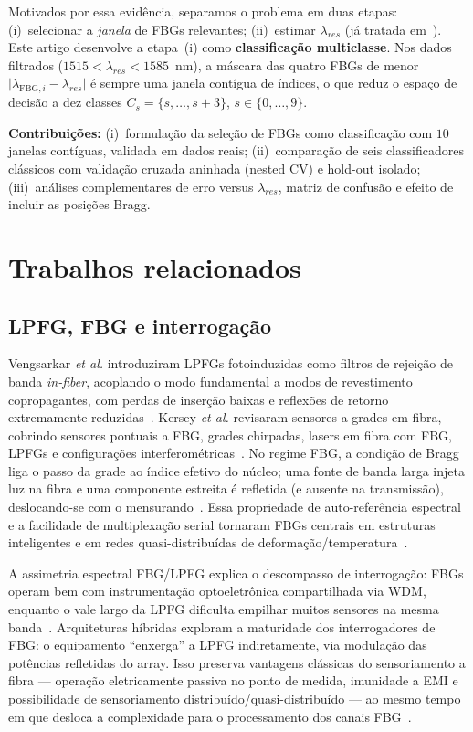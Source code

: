 \documentclass[conference]{IEEEtran}
\begin{document}
Motivados por essa evidência, separamos o problema em duas etapas: (i)~selecionar a \emph{janela} de FBGs relevantes; (ii)~estimar $\lambda_{res}$ (já tratada em~\cite{Barino2025TIM}).
Este artigo desenvolve a etapa~(i) como \textbf{classificação multiclasse}.
Nos dados filtrados ($1515<\lambda_{res}<1585$~nm), a máscara das quatro FBGs de menor $\lvert\lambda_{\mathrm{FBG},i}-\lambda_{res}\rvert$ é sempre uma janela contígua de índices, o que reduz o espaço de decisão a dez classes $C_s=\{s,\ldots,s+3\}$, $s\in\{0,\ldots,9\}$.

\textbf{Contribuições:}
(i)~formulação da seleção de FBGs como classificação com $10$ janelas contíguas, validada em dados reais;
(ii)~comparação de seis classificadores clássicos com validação cruzada aninhada (nested CV) e hold-out isolado;
(iii)~análises complementares de erro versus $\lambda_{res}$, matriz de confusão e efeito de incluir as posições Bragg.

\section{Trabalhos relacionados}

\subsection{LPFG, FBG e interrogação}
Vengsarkar \textit{et al.} introduziram LPFGs fotoinduzidas como filtros de rejeição de banda \emph{in-fiber}, acoplando o modo fundamental a modos de revestimento copropagantes, com perdas de inserção baixas e reflexões de retorno extremamente reduzidas~\cite{James1996LPFG}.
Kersey \textit{et al.} revisaram sensores a grades em fibra, cobrindo sensores pontuais a FBG, grades chirpadas, lasers em fibra com FBG, LPFGs e configurações interferométricas~\cite{Kersey1997FBG}.
No regime FBG, a condição de Bragg liga o passo da grade ao índice efetivo do núcleo; uma fonte de banda larga injeta luz na fibra e uma componente estreita é refletida (e ausente na transmissão), deslocando-se com o mensurando~\cite{Kersey1997FBG}.
Essa propriedade de auto-referência espectral e a facilidade de multiplexação serial tornaram FBGs centrais em estruturas inteligentes e em redes quasi-distribuídas de deformação/temperatura~\cite{Kersey1997FBG}.

A assimetria espectral FBG/LPFG explica o descompasso de interrogação: FBGs operam bem com instrumentação optoeletrônica compartilhada via WDM, enquanto o vale largo da LPFG dificulta empilhar muitos sensores na mesma banda~\cite{Barino2025TIM}.
Arquiteturas híbridas exploram a maturidade dos interrogadores de FBG: o equipamento ``enxerga'' a LPFG indiretamente, via modulação das potências refletidas do array.
Isso preserva vantagens clássicas do sensoriamento a fibra --- operação eletricamente passiva no ponto de medida, imunidade a EMI e possibilidade de sensoriamento distribuído/quasi-distribuído --- ao mesmo tempo em que desloca a complexidade para o processamento dos canais FBG~\cite{Kersey1997FBG}.
\end{document}
